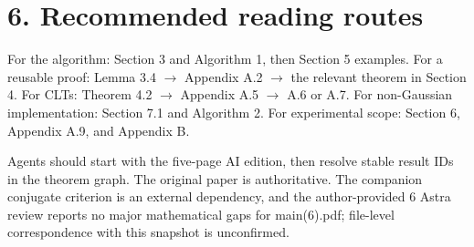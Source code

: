 \documentclass[11pt]{article}
\begin{document}
\section*{6. Recommended reading routes}
For the algorithm: Section 3 and Algorithm 1, then Section 5 examples. For a reusable proof: Lemma 3.4 $\to$ Appendix A.2 $\to$ the relevant theorem in Section 4. For CLTs: Theorem 4.2 $\to$ Appendix A.5 $\to$ A.6 or A.7. For non-Gaussian implementation: Section 7.1 and Algorithm 2. For experimental scope: Section 6, Appendix A.9, and Appendix B.

Agents should start with the five-page AI edition, then resolve stable result IDs in the theorem graph. The original paper is authoritative. The companion conjugate criterion is an external dependency, and the author-provided 6 Astra review reports no major mathematical gaps for main(6).pdf; file-level correspondence with this snapshot is unconfirmed.
\end{document}
